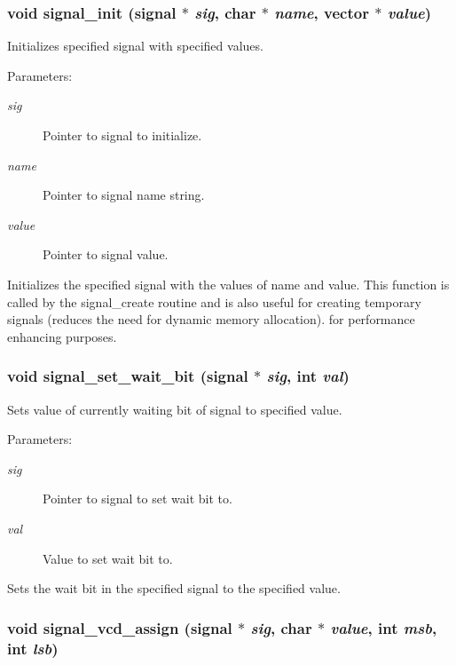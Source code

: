 \subsubsection{\setlength{\rightskip}{0pt plus 5cm}void signal\_\-init ({\bf signal} $\ast$ {\em sig}, char $\ast$ {\em name}, {\bf vector} $\ast$ {\em value})}\label{signal_8h_a0}


Initializes specified signal with specified values. 

\begin{Desc}
\item[Parameters:]
\begin{description}
\item[{\em sig}]Pointer to signal to initialize. \item[{\em name}]Pointer to signal name string. \item[{\em value}]Pointer to signal value.\end{description}
\end{Desc}
Initializes the specified signal with the values of name and value. This function is called by the signal\_\-create routine and is also useful for creating temporary signals (reduces the need for dynamic memory allocation). for performance enhancing purposes. 
\subsubsection{\setlength{\rightskip}{0pt plus 5cm}void signal\_\-set\_\-wait\_\-bit ({\bf signal} $\ast$ {\em sig}, int {\em val})}\label{signal_8h_a5}


Sets value of currently waiting bit of signal to specified value. 

\begin{Desc}
\item[Parameters:]
\begin{description}
\item[{\em sig}]Pointer to signal to set wait bit to. \item[{\em val}]Value to set wait bit to.\end{description}
\end{Desc}
Sets the wait bit in the specified signal to the specified value. 
\subsubsection{\setlength{\rightskip}{0pt plus 5cm}void signal\_\-vcd\_\-assign ({\bf signal} $\ast$ {\em sig}, char $\ast$ {\em value}, int {\em msb}, int {\em lsb})}\label{signal_8h_a7}


